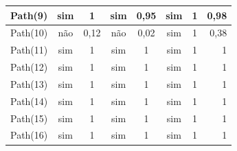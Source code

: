 \begin{table}[htpb]
\begin{tabular}{|l|c|c|c|c|c|c|r|}
            Path(9)   &      sim        &   1             &    sim          &      0,95     &    sim          &      1        &      0,98              \\ \hline
            Path(10)  &      não        &   0,12          &    não          &      0,02     &    sim          &      1        &      0,38              \\ \hline
            Path(11)  &      sim        &   1             &    sim          &      1        &    sim          &      1        &      1                 \\ \hline
            Path(12)  &      sim        &   1             &    sim          &      1        &    sim          &      1        &      1                 \\ \hline
            Path(13)  &      sim        &   1             &    sim          &      1        &    sim          &      1        &      1                 \\ \hline
            Path(14)  &      sim        &   1             &    sim          &      1        &    sim          &      1        &      1                 \\ \hline
            Path(15)  &      sim        &   1             &    sim          &      1        &    sim          &      1        &      1                 \\ \hline
            Path(16)  &      sim        &   1             &    sim          &      1        &    sim          &      1        &      1                 \\ \hline
    \end{tabular}
\end{table}

